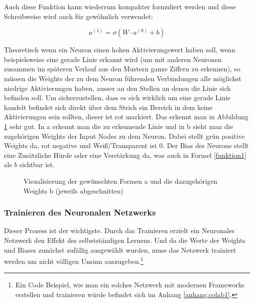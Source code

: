 Auch diese Funktion kann wiederrum kompakter formuliert werden und diese Schreibweise wird auch für gewöhnlich verwendet:

\begin{equation}\label{funktion3}
    a^{(1)}=\sigma(W\cdot a^{(0)}+b)
\end{equation}\footnotemark[20]%

Theoretisch wenn ein Neuron einen hohen Aktivierungswert haben soll, wenn beispielsweise eine gerade Linie erkannt wird (um mit anderen Neuronen zusammen im späteren Verlauf aus den Mustern ganze Ziffern zu erkennen), so müssen die Weights der zu dem Neuron führenden Verbindungen alle möglichst niedrige Aktivierungen haben, ausser an den Stellen an denen die Linie sich befinden soll. Um sicherzustellen, dass es sich wirklich um eine gerade Linie handelt befindet sich direkt über dem Strich ein Bereich in dem keine Aktivierungen sein sollten, dieser ist rot markiert. Das erkennt man in Abbildung \ref{examples} sehr gut. In a erkennt man die zu erkennende Linie und in b sieht man die zugehörigen Weights der Input Nodes zu dem Neuron. Dabei stellt grün positive Weights da, rot negative und Weiß/Transparent ist 0. Der Bias des Neurons stellt eine Zusätzliche Hürde oder eine Verstärkung da, was auch in Formel \ref{funktion1} als $b$ sichtbar ist.

\begin{figure}[H]
    \centering
    \qquad
    \caption[Visualisierung]{Visualisierung der gewünschten Formen a und die dazugehörigen Weights b (jeweils abgeschnitten)}
    \label{examples}%
\end{figure}

\subsubsection{Trainieren des Neuronalen Netzwerks} \label{backpropagation}

Dieser Prozess ist der wichtigste. Durch das Trainieren erzielt ein Neuronales Netzwerk den Effekt des selbstständigen Lernens. Und da die Werte der Weights und Biases zunächst zufällig ausgewählt wurden, muss das Netzwerk trainiert werden um nicht völligen Unsinn auszugeben.\footnote{Ein Code Beispiel, wie man ein solches Netzwerk mit modernen Frameworks erstellen und trainieren würde befindet sich im Anhang \ref{anhang:colab1}.}

